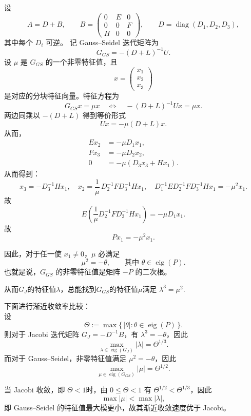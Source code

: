 \documentclass{ctexart}
\begin{document}
\begin{solution}
\begin{enumerate}
设
\[
A = D + B,\qquad
B=\begin{pmatrix}0 & E & 0\\[4pt]0 & 0 & F\\[4pt]H & 0 & 0\end{pmatrix},
\qquad
D=\operatorname{diag}(D_1,D_2,D_3),
\]
其中每个 $D_i$ 可逆。
记 Gauss--Seidel 迭代矩阵为
\[
G_{GS} = - (D+L)^{-1} U.
\]
设 $\mu$ 是 $G_{GS}$ 的一个非零特征值，且
\[
x=\begin{pmatrix}x_1\\ x_2\\ x_3\end{pmatrix}
\]
是对应的分块特征向量。特征方程为
\[
G_{GS} x = \mu x
\quad\Longleftrightarrow\quad
- (D+L)^{-1} U x = \mu x.
\]
两边同乘以 $-(D+L)$ 得到等价形式
\[
U x = -\mu (D+L) x.
\]
从而，
\begin{align}
E x_2 &= -\mu D_1 x_1, \\
F x_3 &= -\mu D_2 x_2, \\
0     &= -\mu (D_3 x_3 + H x_1). 
\end{align}
从而得到：
\[
  x_3 = - D_3^{-1} H x_1,\quad
x_2 = \frac{1}{\mu}\,D_2^{-1} F D_3^{-1} H x_1, \quad
D_1^{-1} E D_2^{-1} F D_3^{-1} H x_1 = -\mu^2 x_1.
\]
故
\[
E\left(\frac{1}{\mu} D_2^{-1} F D_3^{-1} H x_1\right) = -\mu D_1 x_1.
\]
故
\[
P x_1 = -\mu^2 x_1.
\]

因此，对于任一使 $x_1\neq 0$，$\mu$ 必满足
\[
\mu^2 = -\theta,\qquad\text{其中 }\theta\in\operatorname{eig}(P).
\]
也就是说，$G_{GS}$ 的非零特征值是矩阵 $-P$ 的二次根。

从而\(G_J \)的特征值\(\lambda \)，总能找到\(G_{GS} \)的特征值\(\mu  \)满足 \(\lambda^3=\mu^2 \).

下面进行渐近收敛率比较：\\
设
\[
\Theta := \max\{\,|\theta|:\theta\in\operatorname{eig}(P)\,\}.
\]
则对于 Jacobi 迭代矩阵 $G_J=-D^{-1}B$，有 $\lambda^3 = -\theta$，因此
\[
\max_{\lambda\in\operatorname{eig}(G_J)} |\lambda| = \Theta^{1/3}.
\]
而对于 Gauss--Seidel，非零特征值满足 $\mu^2 = -\theta$，因此
\[
\max_{\mu\in\operatorname{eig}(G_{GS})} |\mu| = \Theta^{1/2}.
\]

当 Jacobi 收敛，即 $\Theta<1$时，由 $0\le\Theta<1$ 有 $\Theta^{1/2}<\Theta^{1/3}$，因此
\[
\max|\mu| < \max|\lambda|,
\]
即 Gauss--Seidel 的特征值最大模更小，故其渐近收敛速度优于 Jacobi。


\end{enumerate}
\end{solution}
\end{document}
